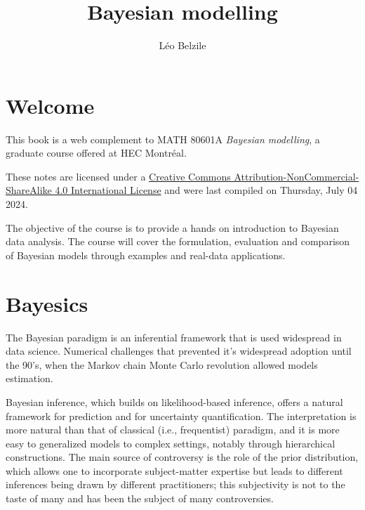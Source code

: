 \documentclass[
  11pt,
  letterpaper,
]{scrbook}
\title{Bayesian modelling}
\author{Léo Belzile}
\date{}
\renewcommand*\contentsname{Table of contents}
\newcommand\contentsname{Table of contents}
\theoremstyle{definition}
\theoremstyle{definition}
\theoremstyle{definition}
\theoremstyle{plain}
\theoremstyle{remark}
\begin{document}
\frontmatter
\maketitle
\ifdefined\Shaded\renewenvironment{Shaded}{\begin{tcolorbox}[interior hidden, breakable, borderline west={3pt}{0pt}{shadecolor}, enhanced, sharp corners, boxrule=0pt, frame hidden]}{\end{tcolorbox}}\fi

\renewcommand*\contentsname{Table of contents}
{
\setcounter{tocdepth}{2}
\tableofcontents
}
\mainmatter
{}

\hypertarget{welcome}{%
\chapter*{Welcome}\label{welcome}}


This book is a web complement to MATH 80601A \emph{Bayesian modelling},
a graduate course offered at HEC Montréal.

These notes are licensed under a
\href{http://creativecommons.org/licenses/by-nc-sa/4.0/}{Creative
Commons Attribution-NonCommercial-ShareAlike 4.0 International License}
and were last compiled on Thursday, July 04 2024.

The objective of the course is to provide a hands on introduction to
Bayesian data analysis. The course will cover the formulation,
evaluation and comparison of Bayesian models through examples and
real-data applications.


\hypertarget{bayesics}{%
\chapter{Bayesics}\label{bayesics}}

The Bayesian paradigm is an inferential framework that is used
widespread in data science. Numerical challenges that prevented it's
widespread adoption until the 90's, when the Markov chain Monte Carlo
revolution allowed models estimation.

Bayesian inference, which builds on likelihood-based inference, offers a
natural framework for prediction and for uncertainty quantification. The
interpretation is more natural than that of classical (i.e.,
frequentist) paradigm, and it is more easy to generalized models to
complex settings, notably through hierarchical constructions. The main
source of controversy is the role of the prior distribution, which
allows one to incorporate subject-matter expertise but leads to
different inferences being drawn by different practitioners; this
subjectivity is not to the taste of many and has been the subject of
many controversies.
\end{document}
